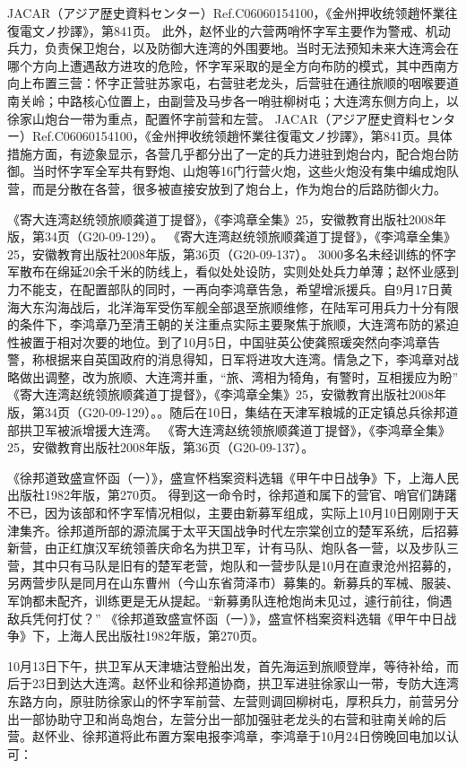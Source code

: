 \documentclass[12pt,UTF8]{ctexbook}
\begin{document}
JACAR（アジア歴史資料センター）Ref.C06060154100，《金州押收统领趙怀業往復電文ノ抄譯》，第841页。
此外，赵怀业的六营两哨怀字军主要作为警戒、机动兵力，负责保卫炮台，以及防御大连湾的外围要地。当时无法预知未来大连湾会在哪个方向上遭遇敌方进攻的危险，怀字军采取的是全方向布防的模式，其中西南方向上布置三营：怀字正营驻苏家屯，右营驻老龙头，后营驻在通往旅顺的咽喉要道南关岭；中路核心位置上，由副营及马步各一哨驻柳树屯；大连湾东侧方向上，以徐家山炮台一带为重点，配置怀字前营和左营。 JACAR（アジア歴史資料センター）Ref.C06060154100，《金州押收统领趙怀業往復電文ノ抄譯》，第841页。具体措施方面，有迹象显示，各营几乎都分出了一定的兵力进驻到炮台内，配合炮台防御。当时怀字军全军共有野炮、山炮等16门行营火炮，这些火炮没有集中编成炮队营，而是分散在各营，很多被直接安放到了炮台上，作为炮台的后路防御火力。

《寄大连湾赵统领旅顺龚道丁提督》，《李鸿章全集》25，安徽教育出版社2008年版，第34页（G20-09-129）。
《寄大连湾赵统领旅顺龚道丁提督》，《李鸿章全集》25，安徽教育出版社2008年版，第36页（G20-09-137）。
3000多名未经训练的怀字军散布在绵延20余千米的防线上，看似处处设防，实则处处兵力单薄；赵怀业感到力不能支，在配置部队的同时，一再向李鸿章告急，希望增派援兵。自9月17日黄海大东沟海战后，北洋海军受伤军舰全部退至旅顺维修，在陆军可用兵力十分有限的条件下，李鸿章乃至清王朝的关注重点实际主要聚焦于旅顺，大连湾布防的紧迫性被置于相对次要的地位。到了10月5日，中国驻英公使龚照瑗突然向李鸿章告警，称根据来自英国政府的消息得知，日军将进攻大连湾。情急之下，李鸿章对战略做出调整，改为旅顺、大连湾并重，“旅、湾相为犄角，有警时，互相援应为盼” 《寄大连湾赵统领旅顺龚道丁提督》，《李鸿章全集》25，安徽教育出版社2008年版，第34页（G20-09-129）。。随后在10日，集结在天津军粮城的正定镇总兵徐邦道部拱卫军被派增援大连湾。 《寄大连湾赵统领旅顺龚道丁提督》，《李鸿章全集》25，安徽教育出版社2008年版，第36页（G20-09-137）。

《徐邦道致盛宣怀函（一）》，盛宣怀档案资料选辑《甲午中日战争》下，上海人民出版社1982年版，第270页。
得到这一命令时，徐邦道和属下的营官、哨官们踌躇不已，因为该部和怀字军情况相似，主要由新募军组成，实际上10月10日刚刚于天津集齐。徐邦道所部的源流属于太平天国战争时代左宗棠创立的楚军系统，后招募新营，由正红旗汉军统领善庆命名为拱卫军，计有马队、炮队各一营，以及步队三营，其中只有马队是旧有的楚军老营，炮队和一营步队是10月在直隶沧州招募的，另两营步队是同月在山东曹州（今山东省菏泽市）募集的。新募兵的军械、服装、军饷都未配齐，训练更是无从提起。“新募勇队连枪炮尚未见过，遽行前往，倘遇敌兵凭何打仗？” 《徐邦道致盛宣怀函（一）》，盛宣怀档案资料选辑《甲午中日战争》下，上海人民出版社1982年版，第270页。

10月13日下午，拱卫军从天津塘沽登船出发，首先海运到旅顺登岸，等待补给，而后于23日到达大连湾。赵怀业和徐邦道协商，拱卫军进驻徐家山一带，专防大连湾东路方向，原驻防徐家山的怀字军前营、左营则调回柳树屯，厚积兵力，前营另分出一部协助守卫和尚岛炮台，左营分出一部加强驻老龙头的右营和驻南关岭的后营。赵怀业、徐邦道将此布置方案电报李鸿章，李鸿章于10月24日傍晚回电加以认可：
\end{document}
